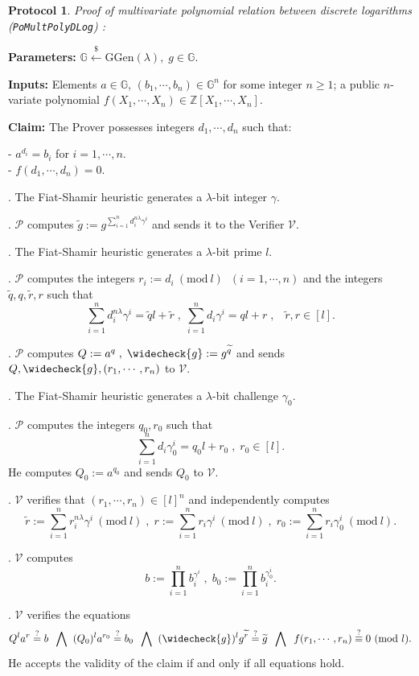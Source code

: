 \documentclass[11pt, lettersize, notitlepage, leqno, footskip=0.6cm]{article}
\newcommand{\bz}{\mathbb Z}
\newcommand{\pl}{\prod\limits}
\newcommand{\slim}{\sum\limits}
\newcommand{\wti}{\widetilde}
\newcommand{\mc}{\mathcal}
\newcommand{\mb}{\mathbb}
\newcommand{\mr}{\mathrm}
\newcommand{\lam}{\lambda}
\newcommand{\lamb}{\lambda}
\newcommand{\weck}{\widecheck}
\newcommand{\mP}{\mc{P}}
\newcommand{\V}{\mc{V}}
\newcommand{\vs}{\vspace{-0.15cm}}
\newcommand{\noin}{\noindent}
\newcommand{\sta}{\stackrel{?}{=}}
\newcommand{\Mod}[1]{\ (\mathrm{mod}\ #1)}
\newtheorem{Prot}[Thm]{Protocol}
\numberwithin{equation}{section}
\begin{document}
\vspace{0.2cm}

\begin{Prot} \normalfont \textit{Proof of multivariate polynomial relation between discrete logarithms}\\ (\verb|PoMultPolyDLog|) :\end{Prot} \vspace{-0.3cm}

\noindent \textbf{Parameters:} $\mb{G}\xleftarrow{\$} \mr{GGen}(\lamb), \; g\in \mb{G}$.

\noindent \textbf{Inputs:} Elements $a\in\mb{G} $, $(b_1,\cdots,b_n)\in \mb{G}^n$ for some integer $n\geq 1$; a public $n$-variate polynomial $f(X_1,\cdots,X_n)\in \bz[X_1,\cdots,X_n]$.

\noindent \textbf{Claim:} The Prover possesses integers $d_1,\cdots, d_n$ such that:

\noindent- $a^{d_i} = b_i$ for $i = 1,\cdots, n$.\\
- $f(d_1,\cdots,d_n) = 0$.

\begin{prf1} . The Fiat-Shamir heuristic generates a $\lam$-bit integer $\gamma$.

. $\mc{P}$ computes $\wti{g}:=g^{\sum\limits_{i=1}^n d_i^{n\lam}\gamma^i}$ and sends it to the Verifier $\mc{V}$.

. The Fiat-Shamir heuristic generates a $\lam$-bit prime $l$.
 
. $\mc{P}$ computes the integers $r_i:=d_i\Mod{l}\;\; (i=1,\cdots, n)$ and the integers $\wti{q}, q, \wti{r}, r$ such that \vs $$\slim_{i=1}^n d_i^{n\lam}\gamma^i = \wti{q}l+\wti{r}\;,\;\slim_{i=1}^n d_i\gamma^i = ql+r\;,\;\;\;\wti{r}, r\in [l] .$$

\noin 5. $\mP$ computes $Q:= a^q\;,\;\weck{g}:= g^{\wti{q}}$ and sends $Q,\weck{g},(r_1,\cdots,r_n)$ to  $\V$. 

\noin 6. The Fiat-Shamir heuristic generates a $\lam$-bit challenge $\gamma_0$.

\noin 7. $\mP$ computes the integers $q_0, r_0$ such that \vs $$\slim_{i=1}^n d_i\gamma_0^i = q_0l+r_0\;,\;r_0\in[l] .$$ He computes $Q_0:= a^{q_{0}}$ and sends $Q_0$ to $\V$.

. $\mc{V}$ verifies that $(r_1,\cdots,r_n)\in [l]^n$ and independently computes \vs $$\wti{r}:= \slim_{i=1}^n r_i^{n\lam}\gamma^i\Mod{l}\;,\;r:= \slim_{i=1}^n r_i\gamma^i\Mod{l}\;,\;r_0:= \slim_{i=1}^n r_i\gamma_0^i\Mod{l}.$$

\noin 9. $\V$ computes \vs $$b:= \pl_{i=1}^n b_i^{\gamma^i}\;,\;b_0:= \pl_{i=1}^n b_i^{\gamma_0^i}.$$

. $\mc{V}$ verifies the equations \vs $$ Q^{l} a^{r} \sta b \;\;\bigwedge\;\;(Q_0)^{l} a^{r_{0}} \sta b_0 \;\;\bigwedge\;\; (\weck{g})^lg^{\wti{r}} \stackrel{?}{=}\wti{g} \;\;\bigwedge\;\;f(r_1,\cdots,r_n) \stackrel{?}{\equiv} 0\Mod{l} .$$ He accepts the validity of the claim if and only if all equations hold.\end{prf1}
\end{document}
